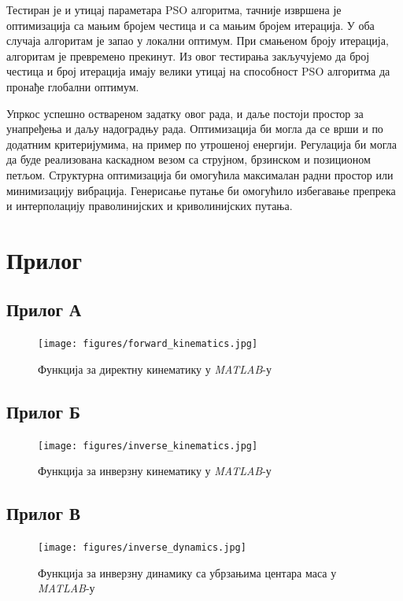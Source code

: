 \documentclass[12pt]{article}
\begin{document}
Тестиран је и утицај параметара PSO алгоритма, тачније извршена је оптимизација са мањим бројем честица и са мањим бројем итерација. У оба случаја алгоритам је запао у локални оптимум. При смањеном броју итерација, алгоритам је превремено прекинут. Из овог тестирања закључујемо да број честица и број итерација имају велики утицај на способност PSO алгоритма да пронађе глобални оптимум.

Упркос успешно оствареном задатку овог рада, и даље постоји простор за унапређења и даљу надоградњу рада. Оптимизација би могла да се врши и по додатним критеријумима, на пример по утрошеној енергији. Регулација би могла да буде реализована каскадном везом са струјном, брзинском и позиционом петљом. Структурна оптимизација би омогућила максималан радни простор или минимизацију вибрација. Генерисање путање би омогућило избегавање препрека и интерполацију праволинијских и криволинијских путања.

\newpage
\section{Прилог}
\subsection{Прилог А}
\begin{figure}[H]
    \centering
    \texttt{[image: figures/forward\_kinematics.jpg]}
    \caption{Функција за директну кинематику у \textit{MATLAB}-у}
    \label{fig:direktna_kinematika_matlab}
\end{figure}
\subsection{Прилог Б}
\begin{figure}[H]
    \raggedright
    \texttt{[image: figures/inverse\_kinematics.jpg]}
    \caption{Функција за инверзну кинематику у \textit{MATLAB}-у}
    \label{fig:inverzna_kinematika_matlab}
\end{figure}
\subsection{Прилог В}
\begin{figure}[H]
    \raggedright
    \texttt{[image: figures/inverse\_dynamics.jpg]}
    \caption{Функција за инверзну динамику са убрзањима центара маса у \textit{MATLAB}-у}
    \label{fig:inverzna_dinamika_matlab}
\end{figure}
\end{document}
